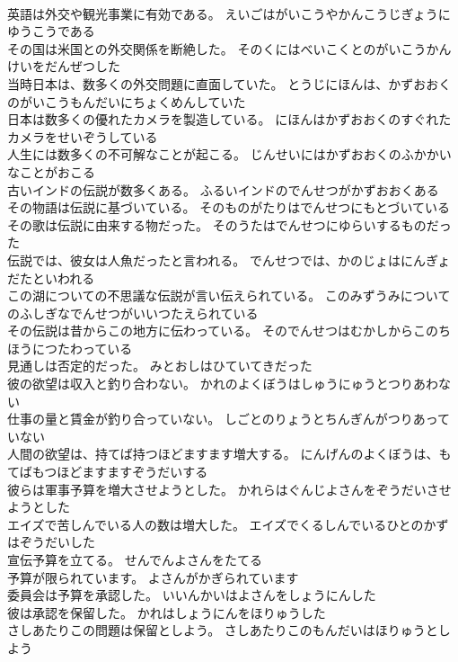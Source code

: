 \documentclass[8pt]{extreport}
\begin{document}
\begin{CJK}{UTF8}{min}
\\	英語は外交や観光事業に有効である。	えいごはがいこうやかんこうじぎょうにゆうこうである 
\\	その国は米国との外交関係を断絶した。	そのくにはべいこくとのがいこうかんけいをだんぜつした 
\\	当時日本は、数多くの外交問題に直面していた。	とうじにほんは、かずおおくのがいこうもんだいにちょくめんしていた 
\\	日本は数多くの優れたカメラを製造している。	にほんはかずおおくのすぐれたカメラをせいぞうしている 
\\	人生には数多くの不可解なことが起こる。	じんせいにはかずおおくのふかかいなことがおこる 
\\	古いインドの伝説が数多くある。	ふるいインドのでんせつがかずおおくある 
\\	その物語は伝説に基づいている。	そのものがたりはでんせつにもとづいている 
\\	その歌は伝説に由来する物だった。	そのうたはでんせつにゆらいするものだった 
\\	伝説では、彼女は人魚だったと言われる。	でんせつでは、かのじょはにんぎょだたといわれる 
\\	この湖についての不思議な伝説が言い伝えられている。	このみずうみについてのふしぎなでんせつがいいつたえられている 
\\	その伝説は昔からこの地方に伝わっている。	そのでんせつはむかしからこのちほうにつたわっている 
\\	見通しは否定的だった。	みとおしはひていてきだった 
\\	彼の欲望は収入と釣り合わない。	かれのよくぼうはしゅうにゅうとつりあわない 
\\	仕事の量と賃金が釣り合っていない。	しごとのりょうとちんぎんがつりあっていない 
\\	人間の欲望は、持てば持つほどますます増大する。	にんげんのよくぼうは、もてばもつほどますますぞうだいする 
\\	彼らは軍事予算を増大させようとした。	かれらはぐんじよさんをぞうだいさせようとした 
\\	エイズで苦しんでいる人の数は増大した。	エイズでくるしんでいるひとのかずはぞうだいした 
\\	宣伝予算を立てる。	せんでんよさんをたてる 
\\	予算が限られています。	よさんがかぎられています 
\\	委員会は予算を承認した。	いいんかいはよさんをしょうにんした 
\\	彼は承認を保留した。	かれはしょうにんをほりゅうした 
\\	さしあたりこの問題は保留としよう。	さしあたりこのもんだいはほりゅうとしよう 

\end{CJK}
\end{document}
